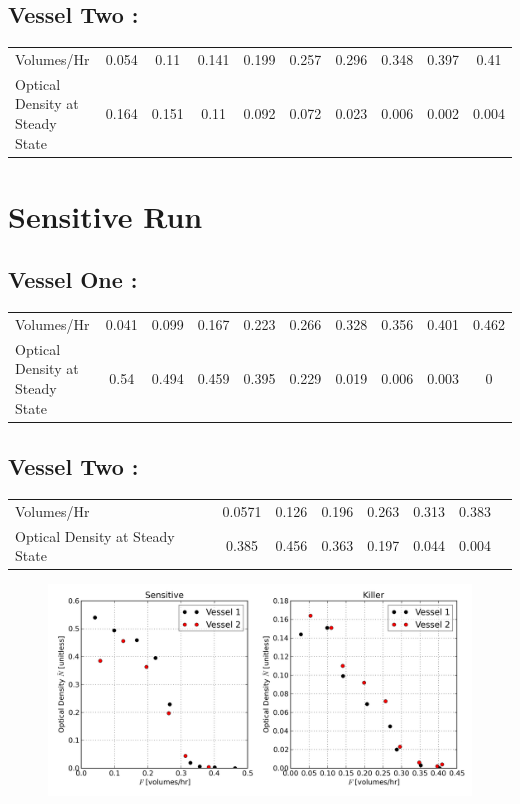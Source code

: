 \subsection*{Vessel Two :}
\begin{center}
\begin{tabular}{l|ccccccccc}
  Volumes/Hr & 0.054 & 0.11 & 0.141 & 0.199 & 0.257 & 0.296 & 0.348 & 0.397 & 0.41 \\
  Optical Density at Steady State & 0.164 & 0.151 & 0.11 & 0.092 & 0.072 & 0.023 & 0.006 & 0.002 & 0.004 \\
\end{tabular}
\end{center}

\section{Sensitive Run}
\subsection*{Vessel One :}
\begin{center}
\begin{tabular}{l|ccccccccc}
  Volumes/Hr & 0.041 & 0.099 & 0.167 & 0.223 & 0.266 & 0.328 & 0.356 & 0.401 & 0.462 \\
 Optical Density at Steady State & 0.54 & 0.494 & 0.459 & 0.395 & 0.229 & 0.019 & 0.006 & 0.003 & 0  \\
\end{tabular}
\end{center}

\subsection*{Vessel Two :}
\begin{center}
\begin{tabular}{l|ccccccc}
 Volumes/Hr & 0.0571 & 0.126 & 0.196 & 0.263 & 0.313 & 0.383  \\
  Optical Density at Steady State & 0.385 & 0.456 & 0.363 & 0.197 & 0.044 & 0.004 \\
\end{tabular}
\end{center}


\begin{figure}[H]
  \centering
    \includegraphics[width=1.0\textwidth]{images/data.png}
\end{figure}





